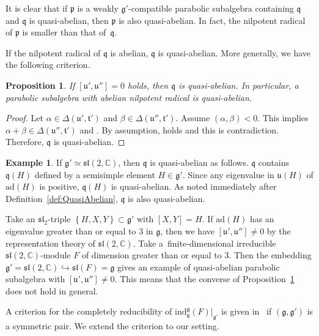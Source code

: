 \documentclass[11pt]{article}
\numberwithin{equation}{section}
\numberwithin{equation}{section}
\newtheorem{Proposition}[Theorem]{Proposition}
\theoremstyle{definition}
\newtheorem{Example}[Theorem]{Example}
\newcommand{\set}[1]{\left\{#1 \right\}}
\newcommand{\BasicRing}[1]{\mathbb{#1}}
\newcommand{\CC}{\BasicRing{C}}
\newcommand{\ad}{\mathrm{ad}}
\newcommand{\lieC}[1]{\mathfrak{#1}}
\newcommand{\lie}[1]{\mathfrak{#1}}
\newcommand{\ind}[2]{\mathrm{ind}^{\lieC{#1}}_{\lieC{#2}}}
\begin{document}
It is clear that if $\lie{p}$ is a weakly $\lie{g'}$-compatible parabolic subalgebra containing $\lie{q}$ and $\lie{q}$ is quasi-abelian, then $\lie{p}$ is also quasi-abelian.
In fact, the nilpotent radical of $\lie{p}$ is smaller than that of~$\lie{q}$.

If the nilpotent radical of $\lie{q}$ is abelian, $\lie{q}$ is quasi-abelian.
More generally, we have the following criterion.

\begin{Proposition}\label{prop:QuasiAbelianCondition}
	If $[\lie{u}', \lie{u}'']=0$ holds, then $\lie{q}$ is quasi-abelian.
	In particular, a parabolic subalgebra with abelian nilpotent radical is quasi-abelian.
\end{Proposition}
	
\begin{proof}
	Let $\alpha \in \Delta(\lie{u'}, \lie{t'})$ and $\beta \in \Delta(\lie{u''}, \lie{t'})$.
	Assume $(\alpha, \beta) < 0$.
	This implies $\alpha + \beta \in \Delta(\lie{u''}, \lie{t'})$
	and \smash{$\bigl[\lie{u}'_{\alpha}, \lie{u}''_{\beta}\bigr]\neq 0$}.
	By assumption, \smash{$\bigl[\lie{u}'_{\alpha}, \lie{u}''_{\beta}\bigr]\subset [\lie{u}', \lie{u}'']=0$} holds and this is contradiction.
	Therefore, $\lie{q}$ is quasi-abelian.
\end{proof}

\begin{Example}
	If $\lie{g'} \simeq \lie{sl}(2,\CC)$, then $\lie{q}$ is quasi-abelian as follows.
	$\lie{q}$ contains $\lie{q}(H)$ defined by a semisimple element $H\in \lie{g'}$.
	Since any eigenvalue in $\lie{u}(H)$ of $\ad(H)$ is positive, $\lie{q}(H)$ is quasi-abelian.
	As noted immediately after Definition~\ref{def:QuasiAbelian}, $\lie{q}$ is also quasi-abelian.

	Take an $\lie{sl}_2$-triple $\set{H, X, Y}\subset \lie{g'}$ with $[X, Y] = H$.
	If $\ad(H)$ has an eigenvalue greater than or equal to $3$ in $\lie{g}$, then we have $[\lie{u'}, \lie{u}''] \neq 0$
	by the representation theory of $\lie{sl}(2,\CC)$.
	Take a~finite-dimensional irreducible $\lie{sl}(2,\CC)$-module $F$ of dimension greater than or equal to $3$.
	Then the embedding $\lie{g'} = \lie{sl}(2,\CC) \hookrightarrow \lie{sl}(F) = \lie{g}$ gives an example
	of quasi-abelian parabolic subalgebra with $[\lie{u'}, \lie{u''}] \neq 0$.
	This means that the converse of Proposition~\ref{prop:QuasiAbelianCondition} does not hold in general.
\end{Example}


A criterion for the completely reducibility of $\ind{g}{q}(F)|_{\lie{g'}}$ is given in~\cite[Lemma~3.1]{EnPaWaWo85} if $(\lie{g}, \lie{g'})$ is a symmetric pair.
We extend the criterion to our setting.
\end{document}
